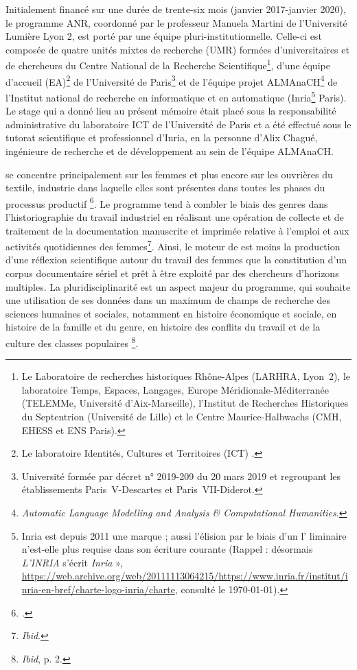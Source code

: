 Initialement financé sur une durée de trente-six mois (janvier 2017-janvier 2020), le programme ANR, coordonné par le professeur Manuela Martini de l'Université Lumière Lyon 2, est porté par une équipe pluri-institutionnelle.  Celle-ci est composée de quatre unités mixtes de recherche (UMR) formées d'universitaires et de chercheurs du Centre National de la Recherche Scientifique\footnote{Le Laboratoire de recherches historiques Rhône-Alpes (LARHRA, Lyon~2), le laboratoire Temps, Espaces, Langages, Europe Méridionale-Méditerranée (TELEMMe, Université d'Aix-Marseille), l'Institut de Recherches Historiques du Septentrion (Université de Lille) et le Centre Maurice-Halbwachs (CMH, EHESS et ENS Paris).}, d'une équipe d'accueil (EA)\footnote{Le laboratoire Identités, Cultures et Territoires (ICT) .} de l'Université de Paris\footnote{Université formée par décret n° 2019-209 du 20 mars 2019 et regroupant les établissements Paris~V-Descartes et Paris~VII-Diderot.} et de l'équipe projet ALMAnaCH\footnote{\textit{Automatic Language Modelling and Analysis \& Computational Humanities}.} de l'Institut national de recherche en informatique et en automatique (Inria\footnote{\og Inria \fg{} est depuis 2011 une marque ; aussi l'élision par le biais d'un \og l' \fg{} liminaire n'est-elle plus requise dans son écriture courante (\og Rappel : désormais \textit{L'INRIA} s'écrit \textit{Inria }», \url{https://web.archive.org/web/20111113064215/https://www.inria.fr/institut/inria-en-bref/charte-logo-inria/charte}, consulté le \today).} Paris). Le stage qui a donné lieu au présent mémoire était placé sous la responsabilité administrative du laboratoire ICT  de l'Université de Paris et a été effectué sous le tutorat scientifique et professionnel d'Inria, en la personne d'Alix Chagué, ingénieure de recherche et de développement au sein de l'équipe ALMAnaCH.

\timeus{} se concentre principalement sur les femmes et plus encore sur les ouvrières du textile, industrie dans laquelle \og elles sont présentes dans toutes les phases du processus productif \fg{}\footnote{\cite[p. 1]{inria}.}. Le programme tend à combler le biais des genres dans l'historiographie du travail industriel en réalisant une opération de collecte et de traitement de la documentation manuscrite et imprimée relative à l'emploi et aux activités quotidiennes des femmes\footnote{\textit{Ibid}.}.  Ainsi, le moteur de \timeus{} est moins la production d'une réflexion scientifique autour du travail des femmes que la constitution d'un corpus documentaire sériel et prêt à être exploité par des chercheurs  d'horizons multiples. La pluridisciplinarité est un aspect majeur du programme, qui souhaite une utilisation de ses données dans un maximum de champs de recherche des sciences humaines et sociales, notamment \og en  histoire économique et sociale, en histoire de la famille et du genre, en histoire des conflits du travail et de la culture des classes populaires \fg{}\footnote{\textit{Ibid}, p. 2.}.

